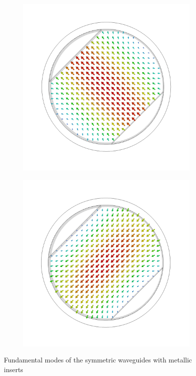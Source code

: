 \documentclass[11pt,a4paper,twoside,openany]{report}
\begin{document}
\begin{figure}[!ht]
\begin{subfigure}{.45\textwidth}
        \includegraphics[width=.75\textwidth]{src/polarizer_circular_mode1.png}
        \caption{\label{fig:circular-polarizer-mode1}}
    \end{subfigure}
    \hspace{0.5cm}
    \begin{subfigure}{.45\textwidth}
        \centering
        \includegraphics[width=.75\textwidth]{src/polarizer_circular_mode2.png}
        \caption{\label{fig:circular-polarizer-mode2}}
    \end{subfigure}
    \caption{\label{fig:symmetric-polarizer-modes}Fundamental modes of the symmetric waveguides with metallic inserts}
\end{figure}
\end{document}
